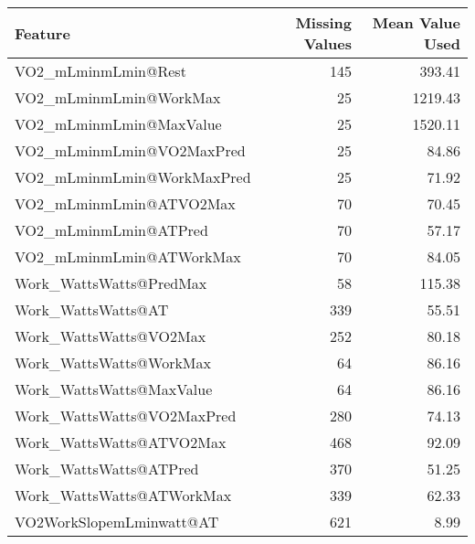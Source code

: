\documentclass{article}
\begin{document}
\begin{table}[H]
    \centering
    \small
    \begin{tabular}{lrr}
        \toprule
        \textbf{Feature}              & \textbf{Missing Values} & \textbf{Mean Value Used} \\
        \midrule
        VO2\_mLminmLmin@Rest          & 145                     & 393.41                   \\
        VO2\_mLminmLmin@WorkMax       & 25                      & 1219.43                  \\
        VO2\_mLminmLmin@MaxValue      & 25                      & 1520.11                  \\
        VO2\_mLminmLmin@VO2MaxPred    & 25                      & 84.86                    \\
        VO2\_mLminmLmin@WorkMaxPred   & 25                      & 71.92                    \\
        VO2\_mLminmLmin@ATVO2Max      & 70                      & 70.45                    \\
        VO2\_mLminmLmin@ATPred        & 70                      & 57.17                    \\
        VO2\_mLminmLmin@ATWorkMax     & 70                      & 84.05                    \\
        Work\_WattsWatts@PredMax      & 58                      & 115.38                   \\
        Work\_WattsWatts@AT           & 339                     & 55.51                    \\
        Work\_WattsWatts@VO2Max       & 252                     & 80.18                    \\
        Work\_WattsWatts@WorkMax      & 64                      & 86.16                    \\
        Work\_WattsWatts@MaxValue     & 64                      & 86.16                    \\
        Work\_WattsWatts@VO2MaxPred   & 280                     & 74.13                    \\
        Work\_WattsWatts@ATVO2Max     & 468                     & 92.09                    \\
        Work\_WattsWatts@ATPred       & 370                     & 51.25                    \\
        Work\_WattsWatts@ATWorkMax    & 339                     & 62.33                    \\
        VO2WorkSlopemLminwatt@AT      & 621                     & 8.99                     \\

\end{tabular}
\end{table}
\end{document}
